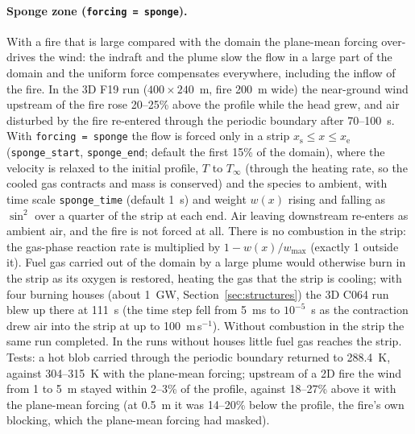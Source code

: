 \documentclass[11pt,a4paper]{article}
\newcommand{\code}[1]{\texttt{#1}}
\begin{document}
\paragraph{Sponge zone (\code{forcing = sponge}).} With a fire that is large compared with the domain the
plane-mean forcing over-drives the wind: the indraft and the plume slow the flow in a large part of the
domain and the uniform force compensates everywhere, including the inflow of the fire. In the 3D F19 run
($400\times240$~m, fire 200~m wide) the near-ground wind upstream of the fire rose 20--25\% above the
profile while the head grew, and air disturbed by the fire re-entered through the periodic boundary after
70--100~s. With \code{forcing = sponge} the flow is forced only in a strip
$x_\text{s}\le x\le x_\text{e}$ (\code{sponge\_start}, \code{sponge\_end}; default the first 15\% of the
domain), where the velocity is relaxed to the initial profile, $T$ to $T_\infty$ (through the heating rate,
so the cooled gas contracts and mass is conserved) and the species to ambient, with time scale
\code{sponge\_time} (default 1~s) and weight $w(x)$ rising and falling as $\sin^2$ over a quarter of the
strip at each end. Air leaving downstream re-enters as ambient air, and the fire is not forced at all.
There is no combustion in the strip: the gas-phase reaction rate is multiplied by $1-w(x)/w_\text{max}$ (exactly 1
outside it). Fuel gas carried out of the domain by a large plume would otherwise burn in the strip as its
oxygen is restored, heating the gas that the strip is cooling; with four burning houses (about 1~GW,
Section~\ref{sec:structures}) the 3D C064 run blew up there at 111~s (the time step fell from 5~ms to
$10^{-5}$~s as the contraction drew air into the strip at up to 100~m\,s$^{-1}$). Without combustion in the
strip the same run completed. In the runs without houses little fuel gas reaches the strip.
Tests: a hot blob carried through the periodic boundary returned to 288.4~K, against 304--315~K with the
plane-mean forcing; upstream of a 2D fire the wind from 1 to 5~m stayed within 2--3\% of the profile, against
18--27\% above it with the plane-mean forcing (at 0.5~m it was 14--20\% below the profile, the fire's own
blocking, which the plane-mean forcing had masked).
\end{document}
